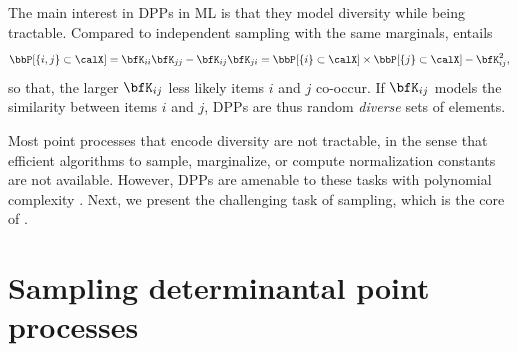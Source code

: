 \documentclass[twoside,11pt]{article}
\begin{document}
        The main interest in DPPs in ML is that they model diversity while being tractable.
        Compared to independent sampling with the same marginals,  entails
        \begin{equation*}
        \label{eq:2point_correlation_function_inclusion_proba_finite_case}
          \Proba{\{i,j\} \subset \calX}
            = {\bfK}_{ii}{\bfK}_{jj}-{\bfK}_{ij}{\bfK}_{ji}
            = \Proba{\{i\} \subset \calX}
              \times \Proba{\{j\} \subset \calX}
                - {\bfK}_{ij}^2,
        \end{equation*}
        so that, the larger $\bfK_{ij}$ less likely items $i$ and $j$ co-occur.
        If $\bfK_{ij}$ models the similarity between items $i$ and $j$, DPPs are thus random \emph{diverse} sets of elements.

        Most point processes that encode diversity are not tractable, in the sense that efficient algorithms to sample, marginalize, or compute normalization constants are not available.
        However, DPPs are amenable to these tasks with polynomial complexity \citep{Gil14}.
        Next, we present the challenging task of sampling, which is the core of \DPPy.


    \section{Sampling determinantal point processes} %
    \label{sec:sampling}
\end{document}

